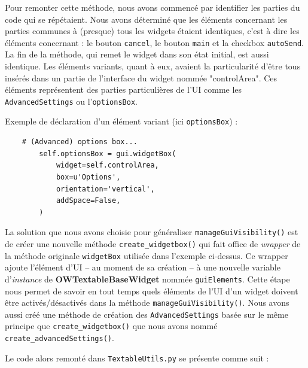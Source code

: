 \documentclass{article}
\begin{document}
Pour remonter cette méthode, nous avons commencé par identifier les parties du code qui se répétaient. Nous avons déterminé que les éléments concernant les parties communes à (presque) tous les widgets étaient identiques, c'est à dire les éléments concernant : le bouton \texttt{cancel}, le bouton \texttt{main} et la checkbox \texttt{autoSend}. La fin de la méthode, qui remet le widget dans son état initial, est aussi identique.
Les éléments variants, quant à eux, avaient la particularité d'être tous insérés dans un partie de l'interface du widget nommée "controlArea". Ces éléments représentent des parties particulières de l'UI comme les \texttt{AdvancedSettings} ou l'\texttt{optionsBox}. 

Exemple de déclaration d'un élément variant (ici \texttt{optionsBox}) : 

\begin{verbatim}
    # (Advanced) options box...
        self.optionsBox = gui.widgetBox(
            widget=self.controlArea,
            box=u'Options',
            orientation='vertical',
            addSpace=False,
        )
\end{verbatim}

La solution que nous avons choisie pour généraliser \texttt{manageGuiVisibility()} est de créer une nouvelle méthode \texttt{create\_widgetbox()} qui fait office de \textit{wrapper} de la méthode originale \texttt{widgetBox} utilisée dans l'exemple ci-dessus. Ce wrapper ajoute l'élément d'UI – au moment de sa création – à une nouvelle variable d'\textit{instance} de \textbf{OWTextableBaseWidget} nommée \texttt{guiElements}. Cette étape nous permet de savoir en tout temps quels éléments de l'UI d'un widget doivent être activés/désactivés dans la méthode \texttt{manageGuiVisibility()}. Nous avons aussi créé une méthode de création des \texttt{AdvancedSettings} basée sur le même principe que \texttt{create\_widgetbox()} que nous avons nommé \texttt{create\_advancedSettings()}.

Le code alors remonté dans \texttt{TextableUtils.py} se présente comme suit : 
\end{document}
